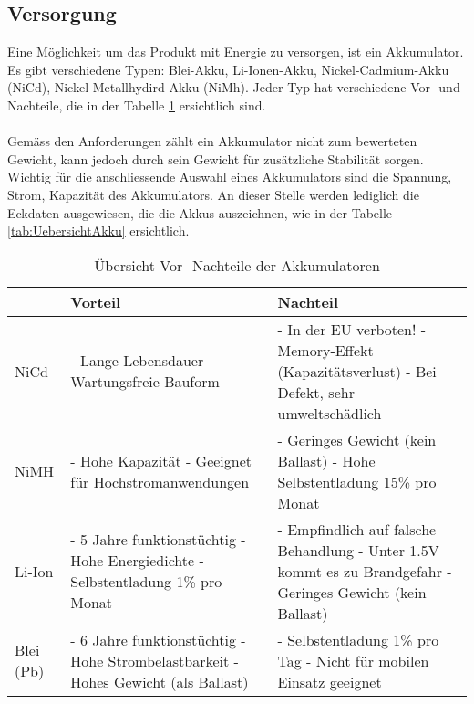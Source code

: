 \subsection{Versorgung}
Eine Möglichkeit um das Produkt mit Energie zu versorgen, ist ein Akkumulator. Es gibt verschiedene Typen: Blei-Akku, Li-Ionen-Akku, Nickel-Cadmium-Akku (NiCd), Nickel-Metallhydird-Akku (NiMh). Jeder Typ hat verschiedene Vor- und Nachteile, die in der Tabelle \ref{tab:UebersichtVorNachTeil} ersichtlich sind.\\
\\
Gemäss den Anforderungen zählt ein Akkumulator nicht zum bewerteten Gewicht, kann jedoch durch sein Gewicht für zusätzliche Stabilität sorgen. Wichtig für die anschliessende Auswahl eines Akkumulators sind die Spannung, Strom, Kapazität des Akkumulators. An dieser Stelle werden lediglich die Eckdaten ausgewiesen, die die Akkus auszeichnen, wie in der Tabelle \ref{tab:UebersichtAkku} ersichtlich.\\ 


\begin{table}[h!]
	\begin{tabular}{|p{1cm}|p{5cm}|p{6cm}|} \hline
		          &\textbf{Vorteil}  & \textbf{Nachteil}\tabularnewline \hline
		NiCd      &  - Lange Lebensdauer \newline - Wartungsfreie Bauform & - In der EU verboten! \newline -  Memory-Effekt (Kapazitätsverlust) \newline - Bei Defekt, sehr umweltschädlich \tabularnewline \hline
		NiMH      & - Hohe Kapazität \newline - Geeignet für Hochstromanwendungen  & - Geringes Gewicht (kein Ballast) \newline - Hohe Selbstentladung 15\% pro Monat \tabularnewline \hline
		Li-Ion    & - 5 Jahre funktionstüchtig \newline - Hohe Energiedichte \newline - Selbstentladung 1\% pro Monat & - Empfindlich auf falsche Behandlung \newline - Unter 1.5V kommt es zu Brandgefahr \newline - Geringes Gewicht (kein Ballast) \tabularnewline \hline
		Blei (Pb) & - 6 Jahre funktionstüchtig \newline - Hohe Strombelastbarkeit \newline - Hohes Gewicht (als Ballast)  & - Selbstentladung 1\% pro Tag \newline - Nicht für mobilen Einsatz geeignet  \tabularnewline \hline
	\end{tabular}
	\centering
	\caption{Übersicht Vor- Nachteile der Akkumulatoren}
	\label{tab:UebersichtVorNachTeil} 
\end{table}

